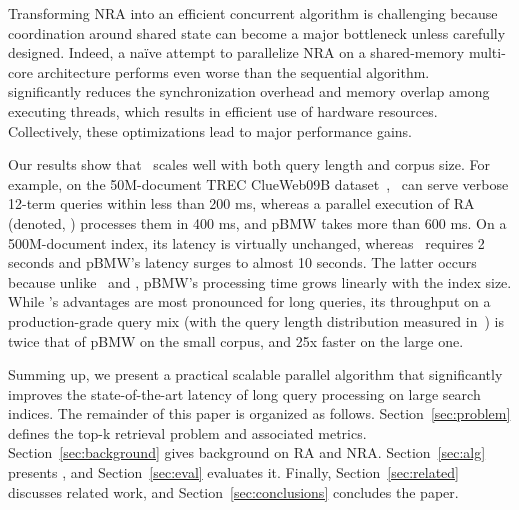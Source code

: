 Transforming NRA into an efficient concurrent algorithm is challenging because coordination around 
shared state can become a major bottleneck unless carefully designed. Indeed, 
a na\"ive attempt to parallelize NRA on a shared-memory multi-core architecture  
performs even worse than the sequential algorithm. \alg\ 
significantly reduces the synchronization 
overhead and memory overlap among executing threads, which results in efficient use 
of hardware resources. Collectively, these optimizations lead to major performance gains. 

Our results show that \alg\ scales well with both query length and corpus size.
For example, on the 50M-document TREC ClueWeb09B dataset~\cite{ClueWeb09}, %
\alg\ can serve verbose 12-term queries within less than 200 ms, 
whereas a parallel execution of RA (denoted, \pRA) processes them in 400 ms, and pBMW takes more than 600 ms. 
On a 500M-document index,  its latency is virtually unchanged, whereas 
 \pRA\ requires 2 seconds and pBMW's latency surges to almost 10 seconds.  The latter occurs because unlike \alg\ and \pRA, 
pBMW's processing time grows linearly with the index size.
While \alg's advantages are most pronounced for long queries, its throughput on a production-grade query mix (with the query length distribution measured in~\cite{sigir/Guy16}) is twice that of pBMW on the small corpus, and 25x faster on the large one.
 
Summing up, we present a practical scalable parallel algorithm that significantly improves the state-of-the-art latency  of long query processing
on large search indices.
%
The remainder of this paper is organized as follows. Section~\ref{sec:problem} defines the top-k retrieval problem and associated metrics. 
Section~\ref{sec:background} gives background on RA and NRA. 
Section~\ref{sec:alg} presents \alg, and Section~\ref{sec:eval}  evaluates it.
Finally, Section~\ref{sec:related} discusses related work, and Section~\ref{sec:conclusions} concludes the paper.